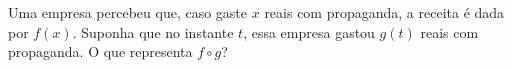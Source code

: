 Uma empresa percebeu que, caso gaste $x$ reais com propaganda, a receita é dada por $f(x)$.
Suponha que no instante $t$, essa empresa gastou $g(t)$ reais com propaganda.
O que representa $f\circ g$?
